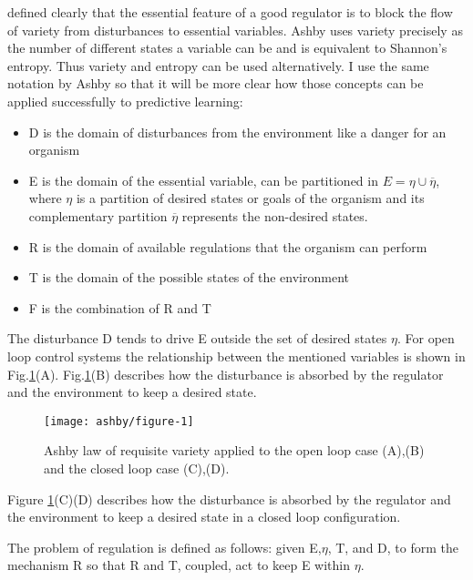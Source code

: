 \citet{Ashby1956:IntroCybernetics} defined clearly that the
 essential feature of a good regulator is to block the flow of variety from
disturbances to essential variables. Ashby uses variety precisely as the number
 of different states a variable can be and is equivalent to Shannon's entropy.
Thus variety and entropy can be used alternatively.
I use the same notation by Ashby so that it will be more clear how those concepts
can be applied successfully to predictive learning:
\begin{itemize}
 \item D is the domain of disturbances from the environment like a danger for an organism
 \item E is the domain of the essential variable, can be partitioned in
$E= \eta \cup \overline{\eta}$, where $\eta$ is a partition of desired states
 or goals of the organism and its complementary partition $\overline{\eta}$
 represents the non-desired states.
 \item R is the domain of available regulations that the organism can perform
 \item T is the domain of the possible states of the environment
 \item F is the combination of R and T
\end{itemize}
The disturbance D tends to drive E outside the set of desired states $\eta$.
For open loop control systems the relationship between the mentioned variables 
is shown in Fig.\ref{fig:infotheory:ashby-model}(A).
Fig.\ref{fig:infotheory:ashby-model}(B) describes how the disturbance is absorbed by the regulator
 and the environment to keep a desired state.
\begin{figure}[!htbp]
\begin{center}
 \texttt{[image: ashby/figure-1]}
\caption[Ashby requisite variety]{Ashby law of requisite variety applied 
to the open loop case (A),(B) and the closed loop case (C),(D).
\label{fig:infotheory:ashby-model}
}
\end{center}
\end{figure}

Figure \ref{fig:infotheory:ashby-model}(C)(D) describes how the disturbance is absorbed by the regulator
 and the environment to keep a desired state in a closed loop configuration.

The problem of regulation is defined as follows: 
given E,$\eta$, T, and D, to form the mechanism R so that R and T, coupled, 
act to keep E within $\eta$.

